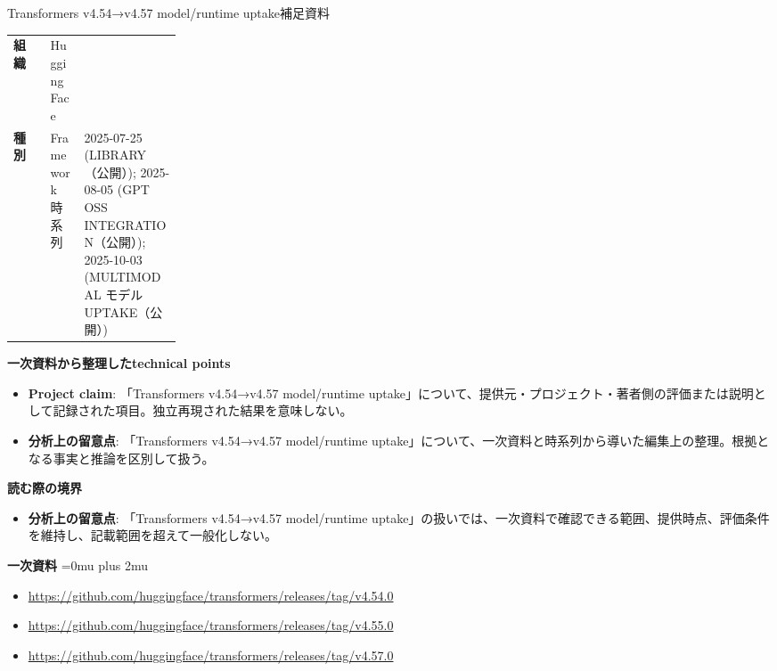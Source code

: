 \begin{technicalnote}{Transformers v4.54→v4.57 model/runtime uptake}{補足資料}
\begingroup
\begin{tabularx}{\linewidth}{@{}>{\bfseries}p{0.22\linewidth}X@{}}
組織 & Hugging Face \\
種別 & Framework
時系列 & 2025-07-25 (LIBRARY（公開）); 2025-08-05 (GPT OSS INTEGRATION（公開）); 2025-10-03 (MULTIMODAL モデル UPTAKE（公開）) \\
\end{tabularx}
\smallskip
{\bfseries 一次資料から整理したtechnical points}
\begin{itemize}[leftmargin=1.5em,itemsep=0.35em]
\item \textbf{Project claim}: 「Transformers v4.54→v4.57 model/runtime uptake」について、提供元・プロジェクト・著者側の評価または説明として記録された項目。独立再現された結果を意味しない。
\item \textbf{分析上の留意点}: 「Transformers v4.54→v4.57 model/runtime uptake」について、一次資料と時系列から導いた編集上の整理。根拠となる事実と推論を区別して扱う。
\end{itemize}
\begin{minipage}{\linewidth}
{\bfseries 読む際の境界}
\begin{itemize}[leftmargin=1.5em,itemsep=0.35em]
\item \textbf{分析上の留意点}: 「Transformers v4.54→v4.57 model/runtime uptake」の扱いでは、一次資料で確認できる範囲、提供時点、評価条件を維持し、記載範囲を超えて一般化しない。
\end{itemize}
\begin{samepage}
{\bfseries 一次資料}
\begingroup\sloppy
\Urlmuskip=0mu plus 2mu\relax
\begin{itemize}[leftmargin=1.5em,itemsep=0.25em]
\item {\scriptsize\url{https://github.com/huggingface/transformers/releases/tag/v4.54.0}}
\item {\scriptsize\url{https://github.com/huggingface/transformers/releases/tag/v4.55.0}}
\item {\scriptsize\url{https://github.com/huggingface/transformers/releases/tag/v4.57.0}}
\end{itemize}
\endgroup
\end{samepage}
\end{minipage}
\endgroup
\end{technicalnote}
\medskip

